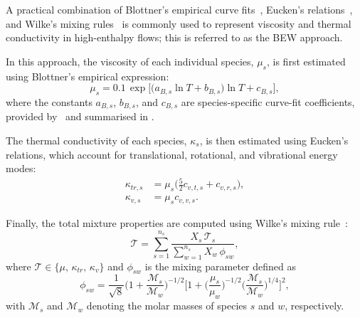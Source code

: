 
A practical combination of Blottner’s empirical curve fits~\citep{blottner1971}, Eucken’s relations~\citep{eucken1931}, and Wilke’s mixing rules~\citep{Wilke1950} is commonly used to represent viscosity and thermal conductivity in high-enthalpy flows; this is referred to as the \gls{BEW} approach.


In this approach, the viscosity of each individual species, $\mu_s$, is first estimated using Blottner’s empirical expression:
\begin{equation}
  \mu_s = 0.1\, \exp\!\Big[ \big( a_{B,s} \ln T + b_{B,s} \big) \ln T + c_{B,s} \Big],
\end{equation}
where the constants $a_{B,s}$, $b_{B,s}$, and $c_{B,s}$ are species-specific curve-fit coefficients, provided by~\citet[Table~5-111]{blottner1971} and summarised in .

The thermal conductivity of each species, $\kappa_s$, is then estimated using Eucken’s relations, which account for translational, rotational, and vibrational energy modes:
\begin{align}
  \kappa_{tr,s} &= \mu_s \Big( \frac{5}{2} c_{v,t,s} + c_{v,r,s} \Big), \\[6pt]
  \kappa_{v,s}  &= \mu_s c_{v,v,s}.
\end{align}

Finally, the total mixture properties are computed using Wilke’s mixing rule~\citep{Wilke1950}:
\begin{equation}
  \mathcal{T} =
  \sum_{s=1}^{n_s}
  \frac{ X_s\, \mathcal{T}_s }{ \sum_{w=1}^{n_s} X_w\, \phi_{sw} },
\end{equation}
where $\mathcal{T} \in \{ \mu,\, \kappa_{tr},\, \kappa_v \}$ and $\phi_{sw}$ is the mixing parameter defined as
\begin{equation}
  \phi_{sw} = \frac{1}{\sqrt{8}}
  \Big( 1 + \frac{\mathcal{M}_s}{\mathcal{M}_w} \Big)^{-1/2}
  \Bigg[
    1 +
    \Big( \frac{\mu_s}{\mu_w} \Big)^{-1/2}
    \Big( \frac{\mathcal{M}_s}{\mathcal{M}_w} \Big)^{1/4}
  \Bigg]^2,
\end{equation}
with $\mathcal{M}_s$ and $\mathcal{M}_w$ denoting the molar masses of species $s$ and $w$, respectively.


